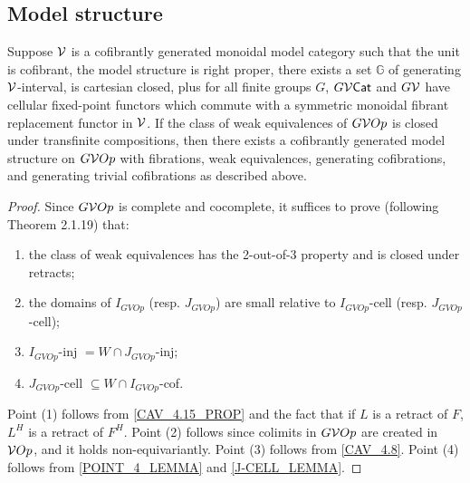 \documentclass[psamsfonts,onesided,10pt,letterpaper]{amsart}%
\begin{document}
\subsection{Model structure}

\begin{theorem}
  \label{MODEL_THEOREM}
  Suppose $\mathcal V$ is a cofibrantly generated monoidal model category such that the unit is cofibrant, the model structure is right proper, there exists a set $\mathbb{G}$ of generating $\mathcal V$-interval, is cartesian closed, plus for all finite groups $G$, $G\mathcal V\mathsf{Cat}$ and $G\mathcal V$ have cellular fixed-point functors which commute with a symmetric monoidal fibrant replacement functor in $\mathcal V$. If the class of weak equivalences of $G\mathcal V Op$ is closed under transfinite compositions, then there exists a cofibrantly generated model structure on $G\mathcal V Op$ with fibrations, weak equivalences, generating cofibrations, and generating trivial cofibrations as described above.
\end{theorem}
\begin{proof}
  Since $G\mathcal V Op$ is complete and cocomplete, it suffices to prove (following \cite{Hov98} Theorem 2.1.19) that:
  \begin{enumerate}
  \item the class of weak equivalences has the 2-out-of-3 property and is closed under retracts;
  \item the domains of $I_{GVOp}$ (resp. $J_{GVOp}$) are small relative to $I_{GVOp}$-cell (resp. $J_{GVOp}$-cell);
  \item $I_{GVOp}$-inj $= W\cap J_{GVOp}$-inj;
  \item $J_{GVOp}$-cell $\subseteq W\cap I_{GVOp}$-cof.
  \end{enumerate}
  Point (1) follows from \ref{CAV_4.15_PROP} and the fact that if $L$ is a retract of $F$, $L^H$ is a retract of $F^H$. Point (2) follows since colimits in $G\mathcal V Op$ are created in $\mathcal V Op$, and it holds non-equivariantly. Point (3) follows from \ref{CAV_4.8}. Point (4) follows from \ref{POINT_4_LEMMA} and \ref{J-CELL_LEMMA}.
\end{proof}





\newpage
{}


\end{document}
